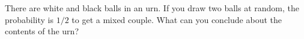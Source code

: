 There are white and black balls in an urn. If you draw two balls at random, the probability is $1/2$ to get a mixed couple. What can you conclude about the contents of the urn?
